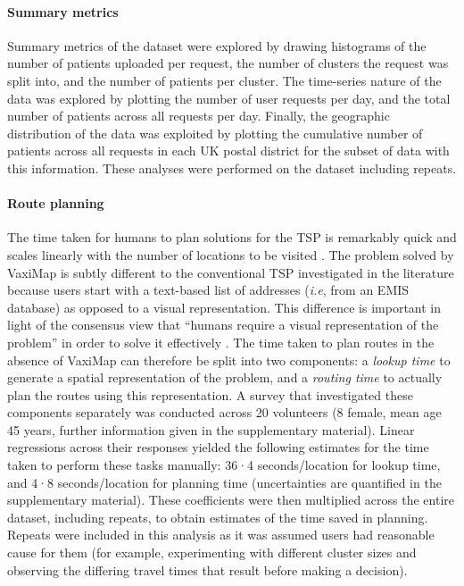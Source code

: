 \documentclass[review]{elsarticle}
\def\vm{VaxiMap}
\begin{document}
\paragraph{Summary metrics}
Summary metrics of the dataset were explored by drawing histograms of the number of patients uploaded per request, the number of clusters the request was split into, and the number of patients per cluster. The time-series nature of the data was explored by plotting the number of user requests per day, and the total number of patients across all requests per day. Finally, the geographic distribution of the data was exploited by plotting the cumulative number of patients across all requests in each UK postal district for the subset of data with this information. These analyses were performed on the dataset including repeats. 

\paragraph{Route planning}
The time taken for humans to plan solutions for the TSP is remarkably quick and scales linearly with the number of locations to be visited \cite{Macgregor1996, Dry2006, MacGregor2011}. The problem solved by \vm{} is subtly different to the conventional TSP investigated in the literature because users start with a text-based list of addresses (\textit{i.e}, from an EMIS database) as opposed to a visual representation. This difference is important in light of the consensus view that ``humans require a visual representation of the problem'' in order to solve it effectively \cite{MacGregor2011}. The time taken to plan routes in the absence of \vm{} can therefore be split into two components: a \textit{lookup time} to generate a spatial representation of the problem, and a \textit{routing time} to actually plan the routes using this representation. A survey that investigated these components separately was conducted across 20 volunteers (8 female, mean age 45 years, further information given in the supplementary material). Linear regressions across their responses yielded the following estimates for the time taken to perform these tasks manually: 36·4 seconds/location for lookup time, and 4·8 seconds/location for planning time (uncertainties are quantified in the supplementary material). These coefficients were then multiplied across the entire dataset, including repeats, to obtain estimates of the time saved in planning. Repeats were included in this analysis as it was assumed users had reasonable cause for them (for example, experimenting with different cluster sizes and observing the differing travel times that result before making a decision). 
\end{document}

